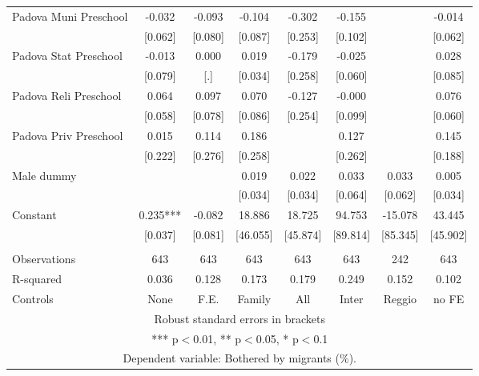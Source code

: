 \begin{tabular}{lccccccc}
Padova Muni Preschool & -0.032 & -0.093 & -0.104 & -0.302 & -0.155 &  & -0.014 \\
 & [0.062] & [0.080] & [0.087] & [0.253] & [0.102] &  & [0.062] \\
Padova Stat Preschool & -0.013 & 0.000 & 0.019 & -0.179 & -0.025 &  & 0.028 \\
 & [0.079] & [.] & [0.034] & [0.258] & [0.060] &  & [0.085] \\
Padova Reli Preschool & 0.064 & 0.097 & 0.070 & -0.127 & -0.000 &  & 0.076 \\
 & [0.058] & [0.078] & [0.086] & [0.254] & [0.099] &  & [0.060] \\
Padova Priv Preschool & 0.015 & 0.114 & 0.186 &  & 0.127 &  & 0.145 \\
 & [0.222] & [0.276] & [0.258] &  & [0.262] &  & [0.188] \\
Male dummy &  &  & 0.019 & 0.022 & 0.033 & 0.033 & 0.005 \\
 &  &  & [0.034] & [0.034] & [0.064] & [0.062] & [0.034] \\
Constant & 0.235*** & -0.082 & 18.886 & 18.725 & 94.753 & -15.078 & 43.445 \\
 & [0.037] & [0.081] & [46.055] & [45.874] & [89.814] & [85.345] & [45.902] \\
 &  &  &  &  &  &  &  \\
Observations & 643 & 643 & 643 & 643 & 643 & 242 & 643 \\
R-squared & 0.036 & 0.128 & 0.173 & 0.179 & 0.249 & 0.152 & 0.102 \\
 Controls & None & F.E. & Family & All & Inter & Reggio & no FE \\ \hline
\multicolumn{8}{c}{ Robust standard errors in brackets} \\
\multicolumn{8}{c}{ *** p$<$0.01, ** p$<$0.05, * p$<$0.1} \\
\multicolumn{8}{c}{ Dependent variable: Bothered by migrants (\%).} \\
\end{tabular}
